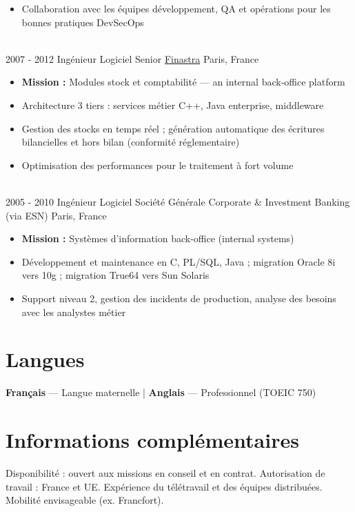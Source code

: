 \documentclass[letterpaper]{twentysecondcv} %
\begin{document}
\begin{twentytimeline}
{\begin{itemize}
		\item Collaboration avec les équipes développement, QA et opérations pour les bonnes pratiques DevSecOps
		\end{itemize}}
	\\
	\twentyitemtimeline{\faCode}
		{2007 -}
		{2012}
		{Ingénieur Logiciel Senior}
		{\href{https://finastra.com}{Finastra}}
		{Paris, France}
		{\begin{itemize}
		\item \textbf{Mission :} Modules stock et comptabilité — an internal back-office platform
		\item Architecture 3 tiers : services métier C++, Java enterprise, middleware
		\item Gestion des stocks en temps réel ; génération automatique des écritures bilancielles et hors bilan (conformité réglementaire)
		\item Optimisation des performances pour le traitement à fort volume
		\end{itemize}}
	\\
	\twentyitemtimeline{\faBriefcase}
		{2005 -}
		{2010}
		{Ingénieur Logiciel}
		{Société Générale Corporate \& Investment Banking (via ESN)}
		{Paris, France}
		{\begin{itemize}
		\item \textbf{Mission :} Systèmes d'information back-office (internal systems)
		\item Développement et maintenance en C, PL/SQL, Java ; migration Oracle 8i vers 10g ; migration True64 vers Sun Solaris
		\item Support niveau 2, gestion des incidents de production, analyse des besoins avec les analystes métier
		\end{itemize}}
\end{twentytimeline}


\section{Langues}

\textbf{Français} — Langue maternelle | \textbf{Anglais} — Professionnel (TOEIC 750)

\section{Informations complémentaires}

Disponibilité : ouvert aux missions en conseil et en contrat. Autorisation de travail : France et UE. Expérience du télétravail et des équipes distribuées. Mobilité envisageable (ex. Francfort).

\end{document}
